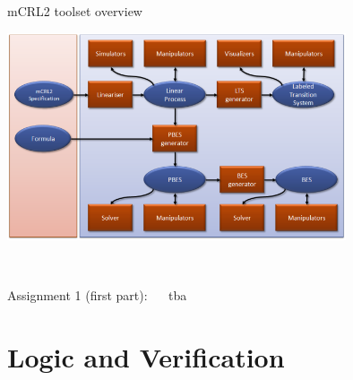 \documentclass[aspectratio=169]{beamer}
\begin{document}
\begin{slide}{mCRL2 toolset overview}
  \centering
  
  \includegraphics[width=0.75\textwidth]{images/mcrl2-toolset.png}

  \\[-10mm]
  \begin{block}{}\centering
    Assignment 1 (first part): ~~ tba
  \end{block}

\end{slide}



\section{Logic and Verification}
\end{document}
